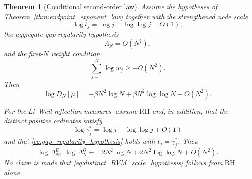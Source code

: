 \documentclass[11pt]{amsart}
\numberwithin{equation}{section}
\theoremstyle{plain}
\newtheorem{theorem}{Theorem}[section]
\theoremstyle{definition}
\theoremstyle{remark}
\newcommand{\RH}{\mathrm{RH}}
\begin{document}
\begin{theorem}[Conditional second-order law]
\label{thm:conditional_second_order}
Assume the hypotheses of Theorem~\ref{thm:endpoint_exponent_law} together with the strengthened node scale
\begin{equation}
\log t_j=\log j-\log\log j+O(1),
\label{eq:RVM_node_scale}
\end{equation}
the aggregate gap regularity hypothesis
\begin{equation}
\Lambda_N=O(N^2),
\label{eq:gap_regularity_hypothesis}
\end{equation}
and the first-$N$ weight condition
\begin{equation}
\sum_{j=1}^{N}\log w_j\ge -O(N^2).
\label{eq:second_order_weight_condition}
\end{equation}
Then
\begin{equation}
\log D_N[\mu]
=-\beta N^2\log N+\beta N^2\log\log N+O(N^2).
\label{eq:conditional_second_order_law}
\end{equation}

For the Li--Weil reflection measures, assume $\RH$ and, in addition, that the distinct positive ordinates satisfy
\begin{equation}
\log\gamma_j^*
=\log j-\log\log j+O(1)
\label{eq:distinct_RVM_scale_hypothesis}
\end{equation}
and that \eqref{eq:gap_regularity_hypothesis} holds with $t_j=\gamma_j^*$.  Then
\begin{equation}
\log\Delta_N^{E},\ \log\Delta_N^{O}
=-2N^2\log N+2N^2\log\log N+O(N^2).
\label{eq:conditional_second_order_li_weil}
\end{equation}
No claim is made that \eqref{eq:distinct_RVM_scale_hypothesis} follows from $\RH$ alone.
\end{theorem}
\end{document}
